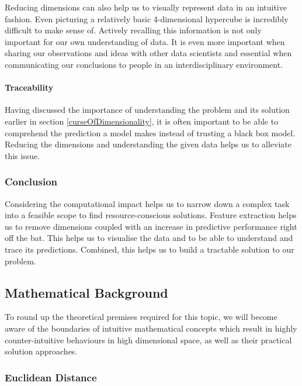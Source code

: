 Reducing dimensions can also help us to visually represent data in an intuitive fashion.
Even picturing a relatively basic 4-dimensional hypercube is incredibly difficult to make sense of.
Actively recalling this information is not only important for our own understanding of data. It is even more important when sharing our observations and ideas with other data scientists and essential when communicating our conclusions to people in an interdisciplinary environment. \cite{PythonMachineLearningCh8}

\paragraph{Traceability}

Having discussed the importance of understanding the problem and its solution earlier in section \ref{curseOfDimensionality}, it is often important to be able to comprehend the prediction a model makes instead of trusting a black box model. 
Reducing the dimensions and understanding the given data helps us to alleviate this issue.

\subsubsection{Conclusion}

Considering the computational impact helps us to narrow down a complex task into a feasible scope to find resource-conscious solutions.
Feature extraction helps us to remove dimensions coupled with an increase in predictive performance right off the bat.
This helps us to visualise the data and to be able to understand and trace its predictions.
Combined, this helps us to build a tractable solution to our problem.

\clearpage


\subsection{Mathematical Background}

To round up the theoretical premises required for this topic, we will become aware of the boundaries of intuitive mathematical concepts which result in highly counter-intuitive behaviours in high dimensional space, as well as their practical solution approaches.

\subsubsection{Euclidean Distance}


